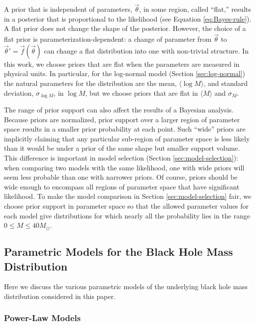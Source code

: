 \documentclass[preprint]{aastex}
\newcommand{\Msun}{M_\odot}
\newcommand{\vtheta}{\vec{\theta}}
\begin{document}
A prior that is independent of parameters, $\vtheta$, in some region,
called ``flat,'' results in a posterior that is proportional to the
likelihood (see Equation \eqref{eq:Bayes-rule}).  A flat prior does
not change the shape of the posterior.  However, the choice of a flat
prior is parameterization-dependent: a change of parameter from
$\vtheta$ to $\vtheta' = \vec{f}(\vtheta)$ can change a flat
distribution into one with non-trivial structure.  In this work, we
choose priors that are flat when the parameters are measured in
physical units.  In particular, for the log-normal model (Section
\ref{sec:log-normal}) the natural parameters for the distribution are
the mean, $\langle \log M \rangle$, and standard deviation,
$\sigma_{\log M}$, in $\log M$, but we choose priors that are flat in
$\langle M \rangle$ and $\sigma_M$.

The range of prior support can also affect the results of a Bayesian
analysis.  Because priors are normalized, prior support over a larger
region of parameter space results in a smaller prior probability at
each point.  Such ``wide'' priors are implicitly claiming that any
particular sub-region of parameter space is less likely than it would
be under a prior of the same shape but smaller support volume.  This
difference is important in model selection (Section
\ref{sec:model-selection}): when comparing two models with the same
likelihood, one with wide priors will seem less probable than one with
narrower priors.  Of course, priors should be wide enough to encompass
all regions of parameter space that have significant likelihood.  To
make the model comparison in Section \ref{sec:model-selection} fair,
we choose prior support in parameter space so that the allowed
parameter values for each model give distributions for which nearly
all the probability lies in the range $0 \leq M \leq 40 \Msun$.

\subsection{Parametric Models for the Black Hole Mass Distribution}
\label{sec:parametric-models}

Here we discuss the various parametric models of the underlying black
hole mass distribution considered in this paper.

\subsubsection{Power-Law Models}
\label{sec:power-law}
\end{document}
